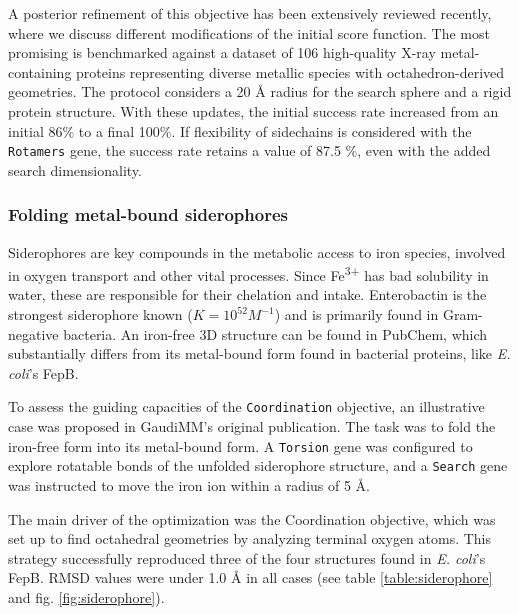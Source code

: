 A posterior refinement of this objective has been extensively reviewed recently,\cite{gaudimetals} where we discuss different modifications of the initial score function. The most promising is benchmarked against a dataset of 106 high-quality X-ray metal-containing proteins representing diverse metallic species with octahedron-derived geometries. The protocol considers a 20 Å radius for the search sphere and a rigid protein structure. With these updates, the initial success rate increased from an initial 86$\%$  to a final 100$\%$. If flexibility of sidechains is considered with the \texttt{Rotamers} gene, the success rate retains a value of 87.5 $\%$, even with the added search dimensionality.

\subsubsection{Folding metal-bound siderophores}
\label{section:siderophore}

Siderophores are key compounds in the metabolic access to iron species, involved in oxygen transport and other vital processes. Since Fe\textsuperscript{3+} has bad solubility in water, these are responsible for their chelation and intake. Enterobactin is the strongest siderophore known ($K = 10^{52} M^{-1}$) and is primarily found in Gram-negative bacteria. An iron-free 3D structure can be found in PubChem,\cite{Enterobactin} which substantially differs from its metal-bound form found in bacterial proteins, like \textit{E. coli}'s FepB.\cite{3tlk}

To assess the guiding capacities of the \texttt{Coordination} objective, an illustrative case was proposed in GaudiMM's original publication. The task was to fold the iron-free form into its metal-bound form. A \texttt{Torsion} gene was configured to explore rotatable bonds of the unfolded siderophore structure, and a \texttt{Search} gene was instructed to move the iron ion within a radius of 5 \AA.

The main driver of the optimization was the Coordination objective, which was set up to find octahedral geometries by analyzing terminal oxygen atoms. This strategy successfully reproduced three of the four structures found in \textit{E. coli}'s FepB. RMSD values were under 1.0 Å in all cases (see table \ref{table:siderophore} and fig. \ref{fig:siderophore}).

